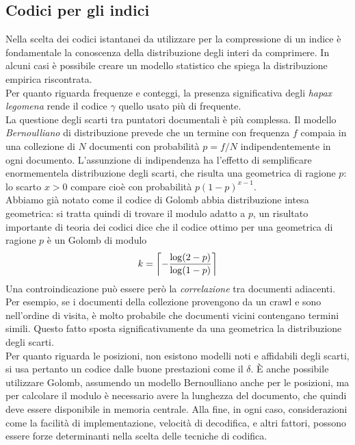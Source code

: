 \subsection{Codici per gli indici}
Nella scelta dei codici istantanei da utilizzare per la compressione di un indice è fondamentale la conoscenza della distribuzione degli interi da comprimere. In alcuni casi è possibile creare un modello statistico che spiega la distribuzione empirica riscontrata.\\
Per quanto riguarda frequenze e conteggi, la presenza significativa degli \textit{hapax legomena} rende il codice $\gamma$ quello usato più di frequente.\\
La questione degli scarti tra puntatori documentali è più complessa. Il modello \textit{Bernoulliano} di distribuzione prevede che un termine con frequenza $f$ compaia in una collezione di $N$ documenti con probabilità $p = f / N$ indipendentemente in ogni documento. L'assunzione di indipendenza ha l'effetto di semplificare enormementela distribuzione degli scarti, che risulta una geometrica di ragione $p$: lo scarto $x > 0$ compare cioè con probabilità $p(1 - p)^{x - 1}$.\\
Abbiamo già notato come il codice di Golomb abbia distribuzione intesa geometrica: si tratta quindi di trovare il modulo adatto a $p$, un risultato importante di teoria dei codici dice che il codice ottimo per una geometrica di ragione $p$ è un Golomb di modulo
\begin{equation}
    k = \left\lceil - \frac{\log(2 - p)}{\log(1 - p)} \right\rceil
\end{equation}
Una controindicazione può essere però la \textit{correlazione} tra documenti adiacenti. Per esempio, se i documenti della collezione provengono da un crawl e sono nell'ordine di visita, è molto probabile che documenti vicini contengano termini simili. Questo fatto sposta significativamente da una geometrica la distribuzione degli scarti.\\
Per quanto riguarda le posizioni, non esistono modelli noti e affidabili degli scarti, si usa pertanto un codice dalle buone prestazioni come il $\delta$. È anche possibile utilizzare Golomb, assumendo un modello Bernoulliano anche per le posizioni, ma per calcolare il modulo è necessario avere la lunghezza del documento, che quindi deve essere disponibile in memoria centrale. Alla fine, in ogni caso, considerazioni come la facilità di implementazione, velocità di decodifica, e altri fattori, possono essere forze determinanti nella scelta delle tecniche di codifica.
